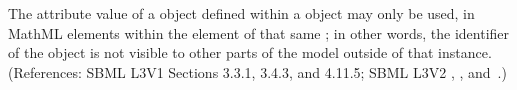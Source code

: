 The  attribute value of a \LocalParameter object defined within a
\KineticLaw object may only be used,  in MathML  elements within
the  element of that same \KineticLaw; in other words, the
identifier of the \LocalParameter object is not visible to other parts of
the model outside of that \Reaction instance.    (References: SBML L3V1 Sections 3.3.1, 3.4.3, and 4.11.5; SBML L3V2
, ,
and~.)

